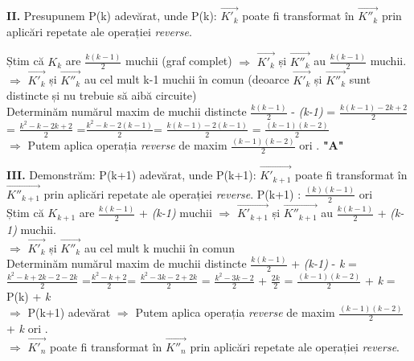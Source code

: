 \documentclass[12pt] {fphw}
\begin{document}
\begin{flushleft}
\textbf{II.} Presupunem P(k) adevărat, unde P(k): {$\vec{K'_k}$} poate fi transformat în  {$\vec{K''_k}$} prin aplicări repetate ale operației \textit{reverse}. 

Știm că {$K_k$} are $\frac{k(k-1)}{2}$ muchii (graf complet) $\Longrightarrow$
{$\vec{K'_k}$} și {$\vec{K''_k}$} au $\frac{k(k-1)}{2}$ muchii.  \\
$\Longrightarrow$ {$\vec{K'_k}$} și {$\vec{K''_k}$} au cel mult k-1 muchii în comun (deoarce {$\vec{K'_k}$} și {$\vec{K''_k}$}  sunt distincte și nu trebuie să aibă circuite) \\
Determinăm numărul maxim de muchii distincte
$\frac{k(k-1)}{2}$ - \textit{(k-1)} = $\frac{k(k-1)- 2k+2}{2}$ = $\frac{k^2-k-2k+2}{2}$ =$\frac{k^2-k-2(k-1)}{2}$= $\frac{k(k-1)-2(k-1)}{2}$ = $\frac{(k-1)(k-2)}{2}$ \\
$\Longrightarrow$ Putem aplica operația \textit{reverse} de maxim $\frac{(k-1)(k-2)}{2}$ ori . \textbf{"A"} 
\end {flushleft}

\begin{flushleft}
\textbf{III.}  Demonstrăm: P(k+1) adevărat, unde P(k+1): {$\vec{K'_{k+1}}$} poate fi transformat în  {$\vec{K''_{k+1}}$} prin aplicări repetate ale operației \textit{reverse}. P(k+1) : $\frac{(k)(k-1)}{2}$ ori \\

Știm că {$K_{k+1}$} are $\frac{k(k-1)}{2}$ + \textit{(k-1)} muchii  $\Longrightarrow$
{$\vec{K'_{k+1}}$} și {$\vec{K''_{k+1}}$} au $\frac{k(k-1)}{2}$ + \textit{(k-1)} muchii.  \\
$\Longrightarrow$ {$\vec{K'_k}$} și {$\vec{K''_k}$} au cel mult k muchii în comun \\
Determinăm numărul maxim de muchii distincte
$\frac{k(k-1)}{2}$ + \textit{(k-1)} - \textit{k} = $\frac{k^2-k+2k-2-2k}{2}$ =$\frac{k^2-k+2}{2}$= $\frac{k^2-3k-2+2k}{2}$ =  $\frac{k^2-3k-2}{2}$ + $\frac{2k}{2}$ = $\frac{(k-1)(k-2)}{2}$ + \textit{k} = P(k) + \textit{k} \\
$\Longrightarrow$ P(k+1) adevărat
$\Longrightarrow$ Putem aplica operația \textit{reverse} de maxim $\frac{(k-1)(k-2)}{2}$ + \textit{k} ori .  \\

$\Longrightarrow$ {$\vec{K'_n}$} poate fi transformat în {$\vec{K''_n}$} prin aplicări repetate ale operației  \textit{reverse}. 

\end {flushleft}
\end{document}
